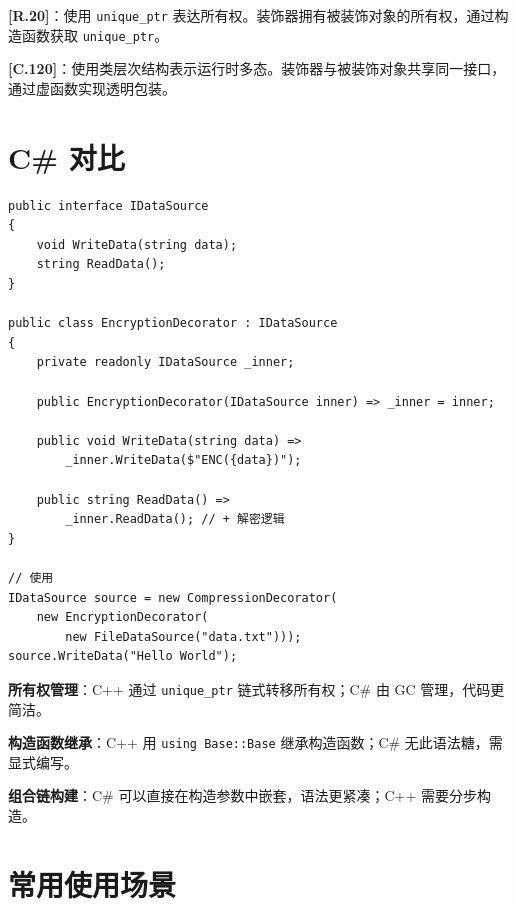 \documentclass[12pt,a4paper,fontset=fandol]{ctexbook}
\newcommand{\guideref}[1]{\textbf{\textcolor{blue!70!black}{[#1]}}}
\begin{document}
\begin{guideline}
\guideref{R.20}：使用 \texttt{unique\_ptr} 表达所有权。装饰器拥有被装饰对象的所有权，通过构造函数获取 \texttt{unique\_ptr}。

\guideref{C.120}：使用类层次结构表示运行时多态。装饰器与被装饰对象共享同一接口，通过虚函数实现透明包装。
\end{guideline}

\section{C\# 对比}

\begin{lstlisting}[style=csharpstyle, caption={装饰器模式 --- C\# 实现}]
public interface IDataSource
{
    void WriteData(string data);
    string ReadData();
}

public class EncryptionDecorator : IDataSource
{
    private readonly IDataSource _inner;

    public EncryptionDecorator(IDataSource inner) => _inner = inner;

    public void WriteData(string data) =>
        _inner.WriteData($"ENC({data})");

    public string ReadData() =>
        _inner.ReadData(); // + 解密逻辑
}

// 使用
IDataSource source = new CompressionDecorator(
    new EncryptionDecorator(
        new FileDataSource("data.txt")));
source.WriteData("Hello World");
\end{lstlisting}

\begin{compare}
\textbf{所有权管理}：C++ 通过 \texttt{unique\_ptr} 链式转移所有权；C\# 由 GC 管理，代码更简洁。

\textbf{构造函数继承}：C++ 用 \texttt{using Base::Base} 继承构造函数；C\# 无此语法糖，需显式编写。

\textbf{组合链构建}：C\# 可以直接在构造参数中嵌套，语法更紧凑；C++ 需要分步构造。
\end{compare}

\section{常用使用场景}
\end{document}
